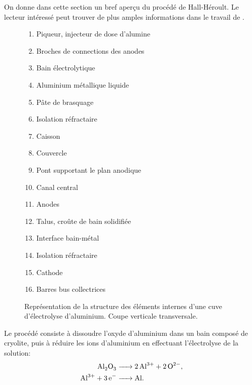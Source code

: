 On donne dans cette section un bref aperçu du procédé de
Hall-Héroult. Le lecteur intéressé peut trouver de plus amples
informations dans le travail de \cite{grjotheim1977aluminium}.

\begin{figure}[t]
\begin{center}
  
  \begin{multicols}{2}
    \small
    \begin{enumerate}[label=\alph*.]
    \item Piqueur, injecteur de dose d'alumine
    \item Broches de connections des anodes
    \item Bain électrolytique
    \item Aluminium métallique liquide
    \item Pâte de brasquage
    \item Isolation réfractaire
    \item Caisson
    \item Couvercle
    \item Pont supportant le plan anodique
    \item Canal central
    \item Anodes
    \item Talus, croûte de bain solidifiée
    \item Interface bain-métal
    \item Isolation réfractaire
    \item Cathode
    \item Barres bus collectrices
    \end{enumerate}
  \end{multicols}
  \caption{Représentation de la structure des éléments internes
    d'une cuve d'électrolyse d'aluminium. Coupe verticale transversale.}
  \label{fig:electrolysis-pot}
\end{center}
\end{figure}

Le procédé consiste à dissoudre l'oxyde d'aluminium dans un bain
composé de cryolite, puis à réduire les ions d'aluminium en effectuant
l'électrolyse de la solution:
\begin{align}
  \cee{Al2O3 &-> 2Al^{3+} + 2O^{2-}},\label{reac:dissociation}\\
  \cee{Al^{3+} + 3e^{-} &-> Al}.\label{reac:electrolysis}
\end{align}

